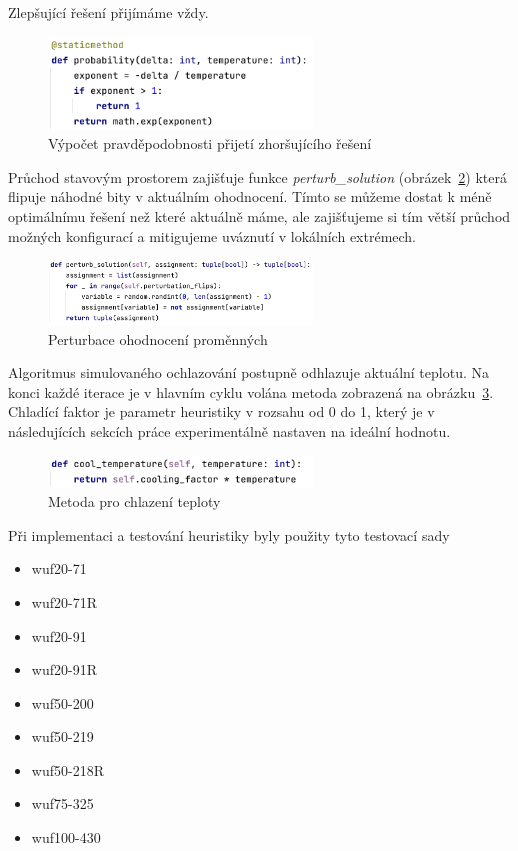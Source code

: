 \documentclass[twoside,twocolumn]{article}
\begin{document}
    Zlepšující řešení přijímáme vždy.

    \begin{figure}
        \centering
        \includegraphics[width=7cm]{images/probabilty}
        \caption{Výpočet pravděpodobnosti přijetí zhoršujícího řešení}
        \label{fig:probabilty}
    \end{figure}

    Průchod stavovým prostorem zajišťuje funkce \emph{perturb\_solution} (obrázek~\ref{fig:perturb}) která flipuje náhodné bity v aktuálním ohodnocení.
    Tímto se můžeme dostat k méně optimálnímu řešení než které aktuálně máme, ale zajišťujeme si tím větší průchod
    možných konfigurací a mitigujeme uváznutí v lokálních extrémech.

    \begin{figure}
        \centering
        \includegraphics[width=7cm]{images/perturb}
        \caption{Perturbace ohodnocení proměnných}
        \label{fig:perturb}
    \end{figure}

    Algoritmus simulovaného ochlazování postupně odhlazuje aktuální teplotu.
    Na konci každé iterace je v hlavním cyklu volána metoda zobrazená na obrázku~\ref{fig:cool}.
    Chladící faktor je parametr heuristiky v rozsahu od 0 do 1, který je v následujících sekcích práce experimentálně nastaven
    na ideální hodnotu.

    \begin{figure}
        \centering
        \includegraphics[width=7cm]{images/cool}
        \caption{Metoda pro chlazení teploty}
        \label{fig:cool}
    \end{figure}

    Při implementaci a testování heuristiky byly použity tyto testovací sady

    \begin{itemize}
        \item wuf20-71
        \item wuf20-71R
        \item wuf20-91
        \item wuf20-91R
        \item wuf50-200
        \item wuf50-219
        \item wuf50-218R
        \item wuf75-325
        \item wuf100-430
    \end{itemize}
\end{document}
